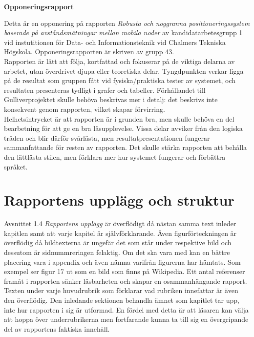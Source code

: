 \documentclass[a4paper,11pt]{article}
\begin{document}
\begin{center}
{\noindent \LARGE {\bf Opponeringsrapport}}\\
\end{center}

Detta är en opponering på rapporten \emph{Robusta och noggranna positioneringssystem baserade på avståndsmätningar mellan mobila noder} av kandidatarbetesgrupp 1 vid instutitionen för Data- och Informationsteknik vid Chalmers Tekniska Högskola. Opponeringsrapporten är skriven av grupp 43. \\

Rapporten är lätt att följa, kortfattad och fokuserar på de viktiga delarna av arbetet, utan överdrivet djupa eller teoretiska delar. Tyngdpunkten verkar ligga på de resultat som gruppen fått vid fysiska/praktiska tester av systemet, och resultaten presenteras tydligt i grafer och tabeller. Förhållandet till Gulliverprojektet skulle behöva beskrivas mer i detalj: det beskrivs inte konsekvent genom rapporten, vilket skapar förvirring. \\

Helhetsintrycket är att rapporten är i grunden bra, men skulle behöva en del bearbetning för att ge en bra läsupplevelse. Vissa delar avviker från den logiska tråden och blir därför svårlästa, men resultatpresentationen fungerar sammanfattande för resten av rapporten. Det skulle stärka rapporten att behålla den lättlästa stilen, men förklara mer hur systemet fungerar och förbättra språket. \\

\section{Rapportens upplägg och struktur}
Avsnittet 1.4 \emph{Rapportens upplägg} är överflödigt då nästan samma text inleder kapitlen samt att varje kapitel är självförklarande. Även figurförteckningen är överflödig då bildtexterna är ungefär det som står under respektive bild och dessutom är sidnummreringen felaktig. Om det ska vara med kan en bättre placering vara i appendix och även nämna varifrån figurerna har hämtats. Som exempel ser figur 17 ut som en bild som finns på Wikipedia. Ett antal referenser framåt i rapporten sänker läsbarheten och skapar en osammanhängande rapport. \\

Texten under varje huvudrubrik som förklarar vad rubriken innefattar är även den överflödig. Den inledande sektionen behandla ämnet som kapitlet tar upp, inte hur rapporten i sig är utformad. En fördel med detta är att läsaren kan välja att hoppa över underrubrikerna men fortfarande kunna ta till sig en övergripande del av rapportens faktiska innehåll. \\
\end{document}
